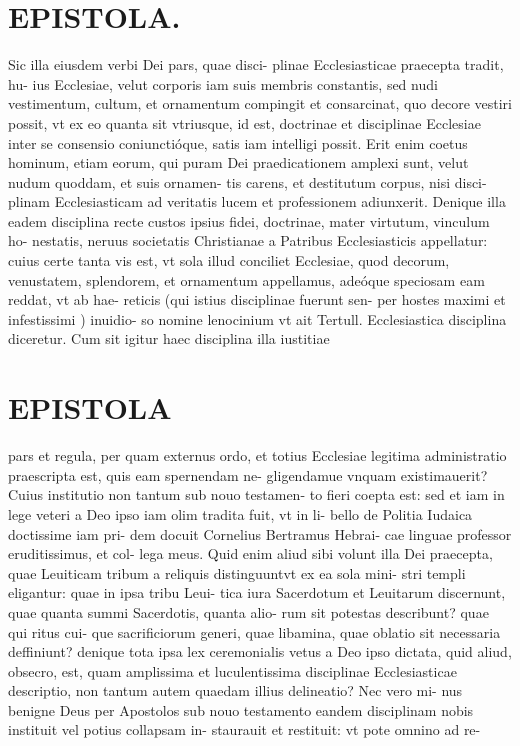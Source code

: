 \documentclass{article}
\begin{document}
\begin{pages}
\section*{EPISTOLA. }Sic illa eiusdem verbi Dei pars, quae disci- plinae Ecclesiasticae praecepta tradit, hu- ius Ecclesiae, velut corporis iam suis membris constantis, sed nudi vestimentum, cultum, et ornamentum compingit et consarcinat, quo decore vestiri possit, vt ex eo quanta sit vtriusque, id est, doctrinae et disciplinae Ecclesiae inter se consensio coniunctióque, satis iam intelligi possit. Erit enim coetus hominum, etiam eorum, qui puram Dei praedicationem amplexi sunt, velut nudum quoddam, et suis ornamen- tis carens, et destitutum corpus, nisi disci- plinam Ecclesiasticam ad veritatis lucem et professionem adiunxerit. Denique illa eadem disciplina recte custos ipsius fidei, doctrinae, mater virtutum, vinculum ho- nestatis, neruus societatis Christianae a Patribus Ecclesiasticis appellatur: cuius certe tanta vis est, vt sola illud conciliet Ecclesiae, quod decorum, venustatem, splendorem, et ornamentum appellamus, adeóque speciosam eam reddat, vt ab hae- reticis (qui istius disciplinae fuerunt sen- per hostes maximi et infestissimi ) inuidio- so nomine lenocinium vt ait Tertull. Ecclesiastica disciplina diceretur. Cum sit igitur haec disciplina illa iustitiae 
\section*{EPISTOLA }pars et regula, per quam externus ordo, et totius Ecclesiae legitima administratio praescripta est, quis eam spernendam ne- gligendamue vnquam existimauerit? Cuius institutio non tantum sub nouo testamen- to fieri coepta est: sed et iam in lege veteri a Deo ipso iam olim tradita fuit, vt in li- bello de Politia Iudaica doctissime iam pri- dem docuit Cornelius Bertramus Hebrai- cae linguae professor eruditissimus, et col- lega meus. Quid enim aliud sibi volunt illa Dei praecepta, quae Leuiticam tribum a reliquis distinguuntvt ex ea sola mini- stri templi eligantur: quae in ipsa tribu Leui- tica iura Sacerdotum et Leuitarum discernunt, quae quanta summi Sacerdotis, quanta alio- rum sit potestas describunt? quae qui ritus cui- que sacrificiorum generi, quae libamina, quae oblatio sit necessaria deffiniunt? denique tota ipsa lex ceremonialis vetus a Deo ipso dictata, quid aliud, obsecro, est, quam amplissima et luculentissima disciplinae Ecclesiasticae descriptio, non tantum autem quaedam illius delineatio? Nec vero mi- nus benigne Deus per Apostolos sub nouo testamento eandem disciplinam nobis instituit vel potius collapsam in- staurauit et restituit: vt pote omnino ad re- 

\end{pages}
\end{document}
